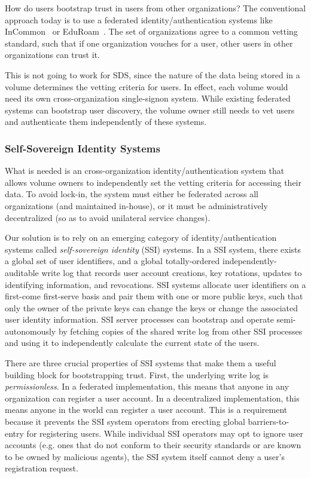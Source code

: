 How do users bootstrap trust in users from other organizations?
The conventional approach today is to use a federated
identity/authentication systems like InCommon~\cite{incommon} or EduRoam~\cite{eduroam}.
The set of organizations agree to a common vetting standard, such that if one
organization vouches for a user, other users in other organizations can trust
it.

This is not going to work for SDS, since the nature of the data being stored
in a volume determines the vetting criteria for users.  In effect, each volume
would need its own cross-organization single-signon system.  While existing
federated systems can bootstrap user discovery, the volume owner still
needs to vet users and authenticate them independently of these systems.

\subsubsection{Self-Sovereign Identity Systems}

What is needed is an cross-organization identity/authentication system that
allows volume owners to independently set the vetting criteria for accessing their data.
To avoid lock-in, the system must either be federated across all organizations
(and maintained in-house), or it must be administratively decentralized (so as
to avoid unilateral service changes).

Our solution is to rely on an emerging category of identity/authentication
systems called \emph{self-sovereign identity} (SSI) systems.
In a SSI system, there exists a global set of user identifiers, and a global
totally-ordered independently-auditable write log that records user account creations, key rotations,
updates to identifying information, and revocations.  SSI systems 
allocate user identifiers on a first-come first-serve basis and pair them with
one or more public keys, such that only the owner of the private keys can 
change the keys or change the associated user identity information.  SSI
server processes can bootstrap and operate semi-autonomously by fetching copies
of the shared write log from other SSI processes and using it to independently
calculate the current state of the users.

There are three crucial properties of SSI systems that make them a useful
building block for bootstrapping trust.  First, the
underlying write log is \emph{permissionless}.  In a federated implementation,
this means that anyone in any organization can register a user account.  In a decentralized
implementation, this means anyone in the world can register a user account.  This is a
requirement because it prevents the SSI system operators from erecting global
barriers-to-entry for registering users.  While individual SSI operators
may opt to ignore user accounts (e.g. ones that do not conform to their security
standards or are known to be owned by malicious agents), the SSI system itself cannot
deny a user's registration request.

